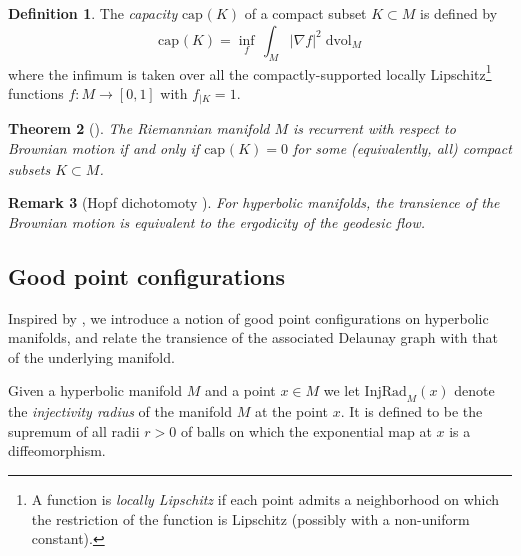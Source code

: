 \documentclass{amsart}
\newcommand{\dd}{\mathrm{d}}
\newcommand{\vol}{\mathrm{vol}}
\newcommand{\capacity}[2][]{\mathrm{cap}_{#1}\left(#2\right)}
\theoremstyle{plain}
\newtheorem{theorem}{Theorem}[section]
\newtheorem{remark}[theorem]{Remark}
\numberwithin{equation}{section}
\theoremstyle{definition}
\newtheorem{definition}[theorem]{Definition}
\begin{document}
\begin{definition}
\label{def:capacity of hyperbolic manifold}
The \emph{capacity} $\capacity{K}$ of a compact subset $K \subset M$ is defined by
\begin{equation}
\capacity{K} = \inf_f \, \int_M |\nabla f|^2 \; \dd \vol_M
\end{equation}
where the infimum is taken over all the compactly-supported locally Lipschitz\footnote{A function is \emph{locally Lipschitz} if each point admits a neighborhood on which the restriction of the function is Lipschitz (possibly with a non-uniform constant).} functions $f : M \to \left[0,1\right]$ with $f_{|K} = 1$.
\end{definition}


\begin{theorem}[{\cite[Theorem 5.1]{grigor1999analytic}}]
\label{theorem:capacity for surfaces}
The Riemannian manifold $M$ is recurrent with respect to  Brownian motion if and only if $\capacity{K} = 0$ for some (equivalently, all) compact subsets $K \subset M$.
\end{theorem}


\begin{remark}[Hopf dichotomoty \cite{hopf1971ergodic,tsuji1959potential,sullivan1979density}]
For hyperbolic manifolds, the transience of the Brownian motion is equivalent to the ergodicity of the geodesic flow.
\end{remark}

\subsection{Good point configurations}

Inspired by \cite{gurel2017recurrence}, we  introduce a notion of good point configurations on hyperbolic manifolds, and relate the transience of the associated Delaunay graph with that of the underlying manifold.

Given a hyperbolic manifold $M$ and a point $x \in M$ we let $\mathrm{InjRad}_M(x)$ denote the \emph{injectivity radius} of the manifold $M$ at the point $x$. It is defined to be the supremum of all radii $r > 0$ of balls on which the exponential map at $x$ is a diffeomorphism.
\end{document}
